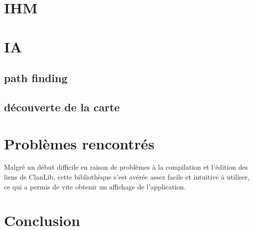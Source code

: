 \documentclass[a4paper 12pts]{article}
\begin{document}
\section{IHM}



\section{IA}


\subsection{path finding}
\subsection{découverte de la carte}



\section{Problèmes rencontrés}

Malgré un début difficile en raison de problèmes à la compilation et l'édition des liens de ClanLib, cette bibliothèque s'est avérée assez facile et intuitive à utiliser, ce qui a permis de vite obtenir un affichage de l'application.

\section{Conclusion}
\end{document}
